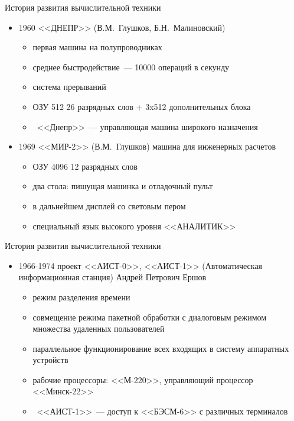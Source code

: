 \documentclass[aspectratio=169,14pt]{beamer}
\begin{document}
\begin{frame}{История развития вычислительной техники}
    \begin{itemize}
        \item 1960 <<ДНЕПР>> (В.М.~Глушков, Б.Н.~Малиновский)
        \begin{itemize}
            \item первая машина на полупроводниках
            \item среднее быстродействие~--- 10000 операций в секунду
            \item система прерываний
            \item ОЗУ 512 26 разрядных слов + 3x512 дополнительных блока
            \item ~<<Днепр>>~--- управляющая машина широкого назначения
        \end{itemize}

        \item 1969 <<МИР-2>> (В.М.~Глушков) машина для инженерных расчетов
        \begin{itemize}
            \item ОЗУ 4096 12 разрядных слов
            \item два стола: пишущая машинка и отладочный пульт
            \item в дальнейшем дисплей со световым пером
            \item специальный язык высокого уровня <<АНАЛИТИК>>
        \end{itemize}
    \end{itemize}
\end{frame}

\begin{frame}{История развития вычислительной техники}
    \begin{itemize}
        \item 1966-1974 проект <<АИСТ-0>>, <<АИСТ-1>> (Автоматическая информационная
        станция) Андрей Петрович Ершов
        \begin{itemize}
            \item режим разделения времени
            \item совмещение режима пакетной обработки с
            диалоговым режимом множества удаленных пользователей
            \item параллельное функционирование всех входящих в систему аппаратных устройств
            \item рабочие процессоры: <<М-220>>, управляющий процессор <<Минск-22>>
            \item ~<<АИСТ-1>>~--- доступ к <<БЭСМ-6>> с различных терминалов
        \end{itemize}
    \end{itemize}
\end{frame}
\end{document}
